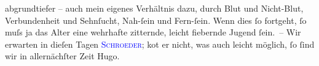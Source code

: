                abgrundtiefer – auch mein eigenes Verhältnis dazu, durch Blut und Nicht-Blut,
               Verbundenheit und Sehnſucht, Nah-ſein und Fern-ſein. Wenn dies ſo fortgeht, ſo muſs
               ja das Alter eine wehrhafte zitternde, leicht fiebernde Jugend ſein. – Wir erwarten in
               dieſen Tagen \textcolor{blue}{\textsc{Schroeder}}{}\ledrightnote{\textcolor{blue}{Rudolf Alexander Schröder}}; ko{\geminationm}t er nicht, was auch leicht möglich, ſo ſind
               wir in allernächſter Zeit \label{T_L02176_1v}\label{T_L02176_1h}\pend
           \pstart \spacefill\mbox{Hugo.}\pend{}\endnumbering{}  
      